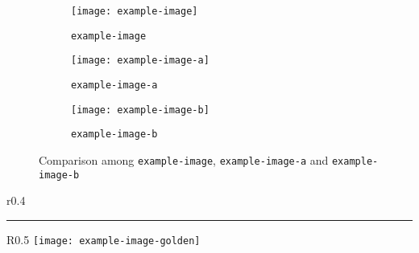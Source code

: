 \documentclass[12pt]{article}
\begin{document}
\begin{figure}[htb]
     \centering
     \begin{subfigure}[t]{0.3\textwidth}
         \centering
         \texttt{[image: example-image]}
         \cprotect\caption{\verb|example-image|}
         \label{fig:example}
     \end{subfigure}
     \hfill
     \begin{subfigure}[t]{0.3\textwidth}
         \centering
         \texttt{[image: example-image-a]}
         \cprotect\caption{\verb|example-image-a|}
         \label{fig:a}
     \end{subfigure}
     \hfill
     \begin{subfigure}[t]{0.3\textwidth}
         \centering
         \texttt{[image: example-image-b]}
         \cprotect\caption{\verb|example-image-b|}
         \label{fig:b}
     \end{subfigure}
        \cprotect\caption{Comparison among \verb|example-image|, \verb|example-image-a| and \verb|example-image-b|}
        \label{fig:three graphs}
\end{figure}

\lipsum[3]

\begin{wrapfigure}{r}{0.4\textwidth}                 %
        \centering
        \rule{4cm}{6cm}
        \cprotect\caption{Wraped figure using \verb|\begin{wrapfigure}|}           %
\end{wrapfigure}

\blindtext

\begin{wrapfigure}{R}{0.5\textwidth}                 
        \centering
        \texttt{[image: example-image-golden]}
        \caption{Image of Golden Ratio}
\end{wrapfigure}

\lipsum[1-4]



\end{document}
